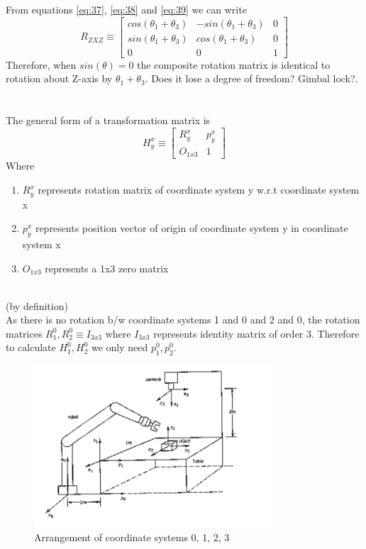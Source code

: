 \documentclass[12pt]{article}
\newcommand{\bydefn}{{\\ \color{blue} \hspace*{\fill}(by definition)} \\}
\newcommand{\rz}[1]{\begin{bmatrix} cos(#1) & -sin(#1) & 0 \\ sin(#1) & cos(#1) & 0 \\ 0 & 0 & 1 \end{bmatrix}}
\begin{document}
From equations \ref{eq:37}, \ref{eq:38} and \ref{eq:39} we can write
\begin{equation}
  \label{eq:310}
  R_{ZXZ} \equiv \rz{\theta_1 + \theta_3}
\end{equation}
Therefore, when $sin(\theta) = 0$ the composite rotation matrix is identical to rotation about Z-axis by $ \theta_1 + \theta_3 $.
{\color{red} Does it lose a degree of freedom? Gimbal lock?}.

\pagebreak
\section{}
The general form of a transformation matrix is
\[
  H_{y}^{x} \equiv \begin{bmatrix} R_{y}^{x} & p_{y}^{x} \\ O_{1x3} & 1 \end{bmatrix}
\]
Where
\begin{enumerate}[nolistsep]
  \item $ R_{y}^{x} $ represents rotation matrix of coordinate system y w.r.t coordinate system x
  \item $ p_{y}^{x} $ represents position vector of origin of coordinate system y in coordinate system x
  \item $ O_{1x3} $ represents a 1x3 zero matrix
\end{enumerate}
\bydefn

As there is no rotation b/w coordinate systems 1 and 0 and 2 and 0, the rotation matrices $ R_{1}^{0}, R_{2}^{0} \equiv I_{3x3} $ where $ I_{3x3} $ represents identity matrix of order 3. Therefore to calculate $ H_{1}^{0}, H_{2}^{0} $ we only need $ p_{1}^{0}, p_{2}^{0} $.

\begin{figure}[h]
  \centering
  \includegraphics[width=0.8\textwidth]{p4-fig.png}
  \caption{Arrangement of coordinate systems 0, 1, 2, 3}
  \label{fig:p4}
\end{figure}
\end{document}

